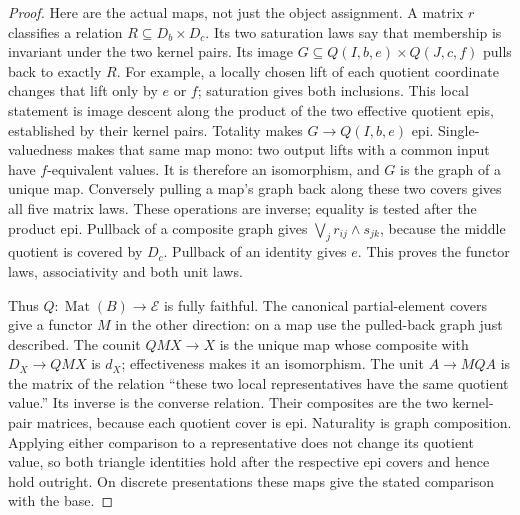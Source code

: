 \begin{proof}
Here are the actual maps, not just the object assignment. A matrix
\(r\) classifies a relation \(R\subseteq D_b\times D_c\).
Its two saturation laws say that membership is invariant under the two
kernel pairs. Its image \(G\subseteq Q(I,b,e)\times Q(J,c,f)\)
pulls back to exactly \(R\). For example, a locally chosen lift of
each quotient coordinate changes that lift only by \(e\) or \(f\);
saturation gives both inclusions. This local statement is image descent
along the product of the two effective quotient epis, established by
their kernel pairs. Totality makes \(G\to Q(I,b,e)\) epi.
Single-valuedness makes that same map mono: two output lifts with a
common input have \(f\)-equivalent values. It is therefore an
isomorphism, and \(G\) is the graph of a unique map. Conversely
pulling a map's graph back along these two covers gives all five
matrix laws. These operations are inverse; equality is tested after
the product epi. Pullback of a composite graph gives
\(\bigvee_j r_{ij}\wedge s_{jk}\), because the middle quotient
is covered by \(D_c\). Pullback of an identity gives \(e\).
This proves the functor laws, associativity and both unit laws.

Thus \(Q:\operatorname{Mat}(B)\to\mathcal E\) is fully faithful.
The canonical partial-element covers give a functor \(M\) in the
other direction: on a map use the pulled-back graph just described.
The counit \(QM X\to X\) is the unique map whose composite with
\(D_X\to QM X\) is \(d_X\); effectiveness makes it an
isomorphism. The unit \(A\to MQ A\) is the matrix of the relation
``these two local representatives have the same quotient value.''
Its inverse is the converse relation. Their composites are the two
kernel-pair matrices, because each quotient cover is epi. Naturality
is graph composition. Applying either comparison to a representative
does not change its quotient value, so both triangle identities hold
after the respective epi covers and hence hold outright. On discrete
presentations these maps give the stated comparison with the base.
\end{proof}

